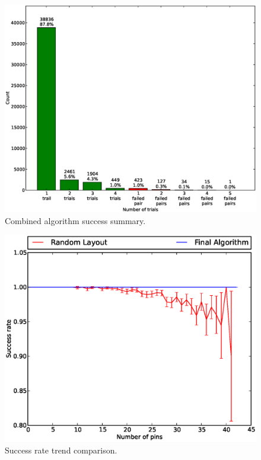 \begin{figure}
\begin{center}
\includegraphics[width=\textwidth]{Images/final_algorithm_num_trials.eps}
\caption[Combined algorithm success summary]{Combined algorithm success summary.}
\label{fig:final_num_trials}
\end{center}
\end{figure}

\begin{figure}
\begin{center}
\includegraphics[width=\textwidth]{Images/final_algorithm_success_rate_trend.eps}
\caption[Combined algorithm success trend]{Success rate trend comparison.}
\label{fig:final_success}
\end{center}
\end{figure}

